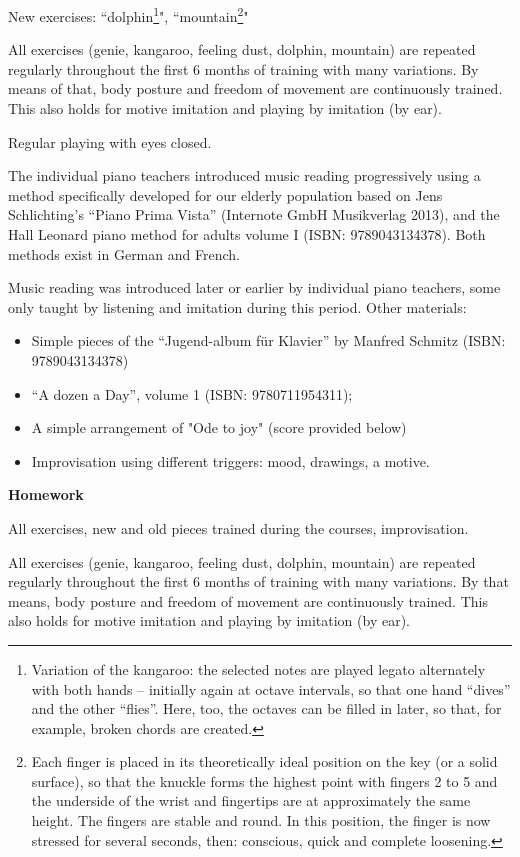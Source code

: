 New exercises: “dolphin\footnote{Variation of the kangaroo: the selected notes are played legato alternately with both hands – initially again at octave intervals, so that one hand “dives” and the other “flies”. Here, too, the octaves can be filled in later, so that, for example, broken chords are created.}", “mountain\footnote{ Each finger is placed in its theoretically ideal position on the key (or a solid surface), so that the knuckle forms the highest point with fingers 2 to 5 and the underside of the wrist and fingertips are at approximately the same height. The fingers are stable and round. In this position, the finger is now stressed for several seconds, then: conscious, quick and complete loosening.}"

All exercises (genie, kangaroo, feeling dust, dolphin, mountain) are repeated regularly throughout the first 6 months of training with many variations. By means of that, body posture and freedom of movement are continuously trained. This also holds for motive imitation and playing by imitation (by ear).

Regular playing with eyes closed.

The individual piano teachers introduced music reading progressively using a method specifically developed for our elderly population based on Jens Schlichting’s “Piano Prima Vista” (Internote GmbH Musikverlag 2013), and the Hall Leonard piano method for adults volume I (ISBN: 9789043134378). Both methods exist in German and French.

Music reading was introduced later or earlier by individual piano teachers, some only taught by listening and imitation during this period.
Other materials:
\begin{itemize}
 \item Simple pieces of the “Jugend-album für Klavier” by Manfred Schmitz (ISBN:
9789043134378)
\item “A dozen a Day”, volume 1 (ISBN: 9780711954311);
\item A simple arrangement of "Ode to joy" (score provided below)
\item Improvisation using different triggers: mood, drawings, a motive.
\end{itemize}

\textbf{Homework}

All exercises, new and old pieces trained during the courses, improvisation.

All exercises (genie, kangaroo, feeling dust, dolphin, mountain) are repeated regularly throughout the first 6 months of training with many variations. By that means, body posture and freedom of movement are continuously trained. This also holds for motive imitation and playing by imitation (by ear).

